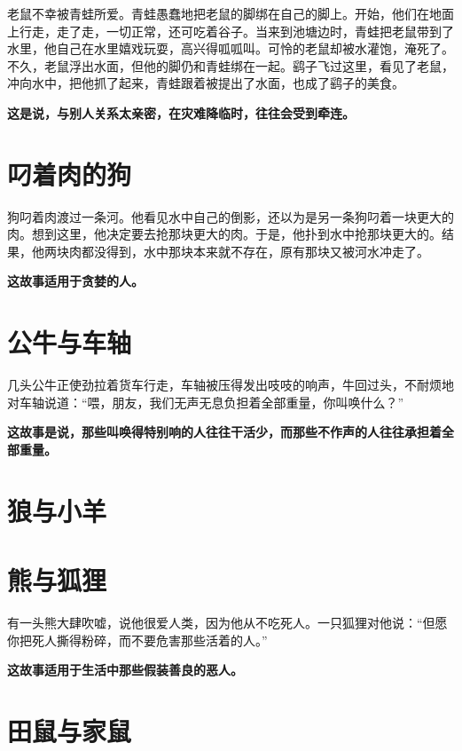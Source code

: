 老鼠不幸被青蛙所爱。青蛙愚蠢地把老鼠的脚绑在自己的脚上。开始，他们在地面上行走，走了走，一切正常，还可吃着谷子。当来到池塘边时，青蛙把老鼠带到了水里，他自己在水里嬉戏玩耍，高兴得呱呱叫。可怜的老鼠却被水灌饱，淹死了。不久，老鼠浮出水面，但他的脚仍和青蛙绑在一起。鹞子飞过这里，看见了老鼠，冲向水中，把他抓了起来，青蛙跟着被提出了水面，也成了鹞子的美食。

{\bfseries \color{red}这是说，与别人关系太亲密，在灾难降临时，往往会受到牵连。}

\section{叼着肉的狗}

狗叼着肉渡过一条河。他看见水中自己的倒影，还以为是另一条狗叼着一块更大的肉。想到这里，他决定要去抢那块更大的肉。于是，他扑到水中抢那块更大的。结果，他两块肉都没得到，水中那块本来就不存在，原有那块又被河水冲走了。

{\bfseries \color{red}这故事适用于贪婪的人。}

\section{公牛与车轴}

几头公牛正使劲拉着货车行走，车轴被压得发出吱吱的响声，牛回过头，不耐烦地对车轴说道：“喂，朋友，我们无声无息负担着全部重量，你叫唤什么？”

{\bfseries \color{red}这故事是说，那些叫唤得特别响的人往往干活少，而那些不作声的人往往承担着全部重量。}

\section{狼与小羊}



{\bfseries \color{red}}

\section{熊与狐狸}

有一头熊大肆吹嘘，说他很爱人类，因为他从不吃死人。一只狐狸对他说：“但愿你把死人撕得粉碎，而不要危害那些活着的人。”

{\bfseries \color{red}这故事适用于生活中那些假装善良的恶人。}

\section{田鼠与家鼠}

